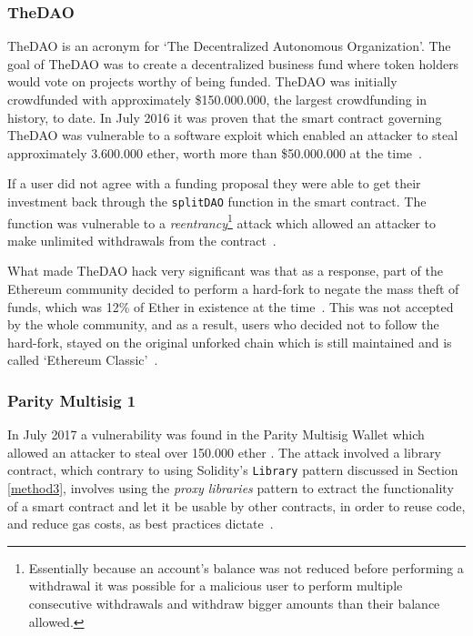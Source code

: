 \subsubsection{TheDAO} \label{thedao}
TheDAO is an acronym for `The Decentralized Autonomous Organization'. The goal of TheDAO was to create a decentralized business fund where token holders would vote on projects worthy of being funded. TheDAO was initially crowdfunded with approximately \$150.000.000, the largest crowdfunding in history, to date. In July 2016 it was proven that the smart contract governing TheDAO was vulnerable to a software exploit which enabled an attacker to steal approximately 3.600.000 ether, worth more than \$50.000.000 at the time~\cite{bloombergdao}.

If a user did not agree with a funding proposal they were able to get their investment back through the \texttt{splitDAO} function in the smart contract. The function was vulnerable to a \textit{reentrancy}\footnote{Essentially because an account's balance was not reduced before performing a withdrawal it was possible for a malicious user to perform multiple consecutive withdrawals and withdraw bigger amounts than their balance allowed.} attack which allowed an attacker to make unlimited withdrawals from the contract~\cite{hackingdistibuteddao}.

What made TheDAO hack very significant was that as a response, part of the Ethereum community decided to perform a hard-fork to negate the mass theft of funds, which was 12\% of Ether in existence at the time~\cite{bloombergdao}. This was not accepted by the whole community, and as a result, users who decided not to follow the hard-fork, stayed on the original unforked chain which is still maintained and is called `Ethereum Classic'~\cite{etc}. 

\subsubsection{Parity Multisig 1}
In July 2017 a vulnerability was found in the Parity Multisig Wallet which allowed an attacker to steal over 150.000 ether \cite{parityhack}. The attack involved a library contract, which contrary to using Solidity's \texttt{Library} pattern discussed in Section \ref{method3}, involves using the \textit{proxy libraries} pattern to extract the functionality of a smart contract and let it be usable by other contracts, in order to reuse code, and reduce gas costs, as best practices dictate~\cite{proxylibraries}.

